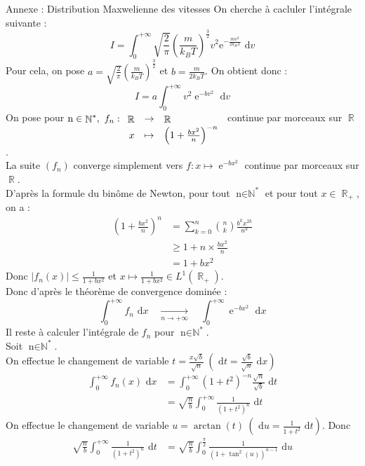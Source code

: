 \documentclass{beamer}
\newcommand{\dint}[1]{\text{ d}#1}
\newcommand{\toinf}[1]{\underset{#1\to+\infty}{\longrightarrow}}
\DeclareMathOperator{\e}{\mathrm{e}}
\DeclareMathOperator{\R}{\mathbb{R}}
\DeclareMathOperator{\N}{\mathbb{N}}
\DeclareMathOperator{\n}{n\in\N}
\begin{document}
\begin{frame}{Annexe : Distribution Maxwelienne des vitesses}
    On cherche à cacluler l'intégrale suivante :
    \[ I = \int_0^{+\infty}\sqrt{\frac{2}{\pi}}\left(\frac{m}{k_BT}\right)^\frac{3}{2}v^2\mathrm{e}^{-\frac{mv^2}{2k_BT}}\dint{v} \]
    Pour cela, on pose $\displaystyle a=\sqrt{\frac{2}{\pi}}\left(\frac{m}{k_BT}\right)^\frac{3}{2}$ et $\displaystyle b=\frac{m}{2k_BT}$. On obtient donc :
    \[ I = a\int_0^{+\infty}v^2\e^{-bv^2}\dint{v} \]
    On pose pour $\n^*,\ f_n:\begin{array}[t]{rcl}
        \R&\to&\R\\x&\mapsto&\left(1+\frac{bx^2}{n}\right)^{-n}
    \end{array}$ continue par morceaux sur $\R$. \\
    La suite $(f_n)$ converge simplement vers $f:x\mapsto\e^{-bx^2}$ continue par morceaux sur $\R$. \\
    D'après la formule du binôme de Newton, pour tout $\n^*$ et pour tout $x\in\R_+$, on a :
    \begin{align*}
        \left(1+\frac{bx^2}{n}\right)^n &= \sum_{k=0}^n\binom{n}{k}\frac{b^kx^{2k}}{n^k} \\
        &\geqslant 1 + n\times\frac{bx^2}{n} \\
        &= 1 + bx^2
    \end{align*}
    Donc $\displaystyle|f_n(x)|\leqslant\frac{1}{1+bx^2}$ et $\displaystyle x\mapsto\frac{1}{1+bx^2}\in L^1(\R_+)$. \\
    Donc d'après le théorème de convergence dominée :
    \[ \int_0^{+\infty}f_n\dint{x}\quad\toinf{n}\quad\int_0^{+\infty}\e^{-bx^2}\dint{x} \]
    Il reste à calculer l'intégrale de $f_n$ pour $\n^*$. \\
    Soit $\n^*$. \\
    On effectue le changement de variable $\displaystyle t=\frac{x\sqrt{b}}{\sqrt{n}}\ \left(\dint{t}=\frac{\sqrt{b}}{\sqrt{n}}\dint{x}\right)$
    \begin{align*}
        \int_0^{+\infty}f_n(x)\dint{x} &= \int_0^{+\infty}(1+t^2)^{-n}\frac{\sqrt{n}}{\sqrt{b}}\dint{t} \\
        &= \sqrt{\frac{n}{b}}\int_0^{+\infty}\frac{1}{(1+t^2)^n}\dint{t}
    \end{align*}
    On effectue le changement de variable $\displaystyle u=\arctan(t)\ \left(\dint{u}=\frac{1}{1+t^2}\dint{t}\right)$. Donc
    \begin{align*}
        \sqrt{\frac{n}{b}}\int_0^{+\infty}\frac{1}{(1+t^2)^n}\dint{t} &= \sqrt{\frac{n}{b}}\int_0^{\frac{\pi}{2}}\frac{1}{(1+\tan^2(u))^{n-1}}\dint{u} \\

\end{align*}
\end{frame}
\end{document}

